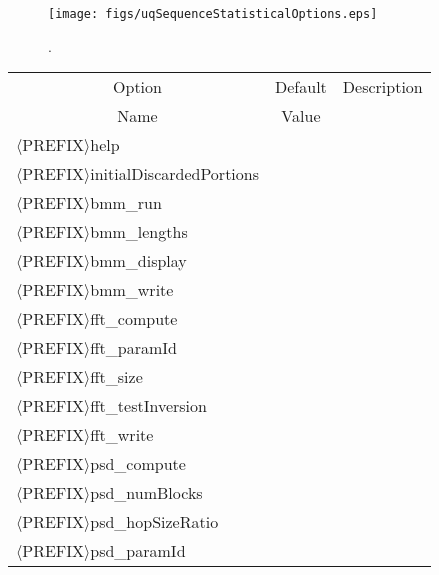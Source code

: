 \begin{figure}[h!]
\centerline{
\texttt{[image: figs/uqSequenceStatisticalOptions.eps]}
}
\caption{
{\color{red}{The sequence statistical options class}}.
}
\label{fig-seq-statistical-options-class}
\end{figure}

\begin{table}[!h]
\begin{center}
\begin{tabular}{|l|c|c|}
\hline
\multicolumn{1}{|c|}{Option}                      & Default & Description \\
\multicolumn{1}{|c|}{Name}                        & Value   &             \\
\hline
\hline
$\langle$PREFIX$\rangle$help                      &         &             \\
\hline
$\langle$PREFIX$\rangle$initialDiscardedPortions  &         &             \\
\hline
\hline
$\langle$PREFIX$\rangle$bmm\_run                   &         &             \\
\hline
$\langle$PREFIX$\rangle$bmm\_lengths               &         &             \\
\hline
$\langle$PREFIX$\rangle$bmm\_display               &         &             \\
\hline
$\langle$PREFIX$\rangle$bmm\_write                 &         &             \\
\hline
\hline
$\langle$PREFIX$\rangle$fft\_compute               &         &             \\
\hline
$\langle$PREFIX$\rangle$fft\_paramId               &         &             \\
\hline
$\langle$PREFIX$\rangle$fft\_size                  &         &             \\
\hline
$\langle$PREFIX$\rangle$fft\_testInversion         &         &             \\
\hline
$\langle$PREFIX$\rangle$fft\_write                 &         &             \\
\hline
\hline
$\langle$PREFIX$\rangle$psd\_compute               &         &             \\
\hline
$\langle$PREFIX$\rangle$psd\_numBlocks             &         &             \\
\hline
$\langle$PREFIX$\rangle$psd\_hopSizeRatio          &         &             \\
\hline
$\langle$PREFIX$\rangle$psd\_paramId               &         &             \\

\end{tabular}
\end{center}
\end{table}

